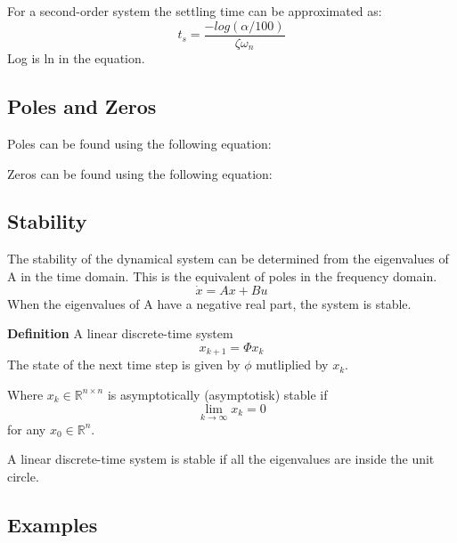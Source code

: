 For a second-order system the settling time can be approximated as:
$$t_s = \frac{-log(\alpha/100)}{\zeta \omega_n}$$
Log is ln in the equation.

\subsection{Poles and Zeros}

Poles can be found using the following equation:

Zeros can be found using the following equation:



\subsection{Stability}
The stability of the dynamical system can be determined from the eigenvalues of A in the time domain.
This is the equivalent of poles in the frequency domain.
$$\dot{x} = Ax+Bu$$
When the eigenvalues of A have a negative real part, the system is stable.

\textbf{Definition}
A linear discrete-time system
$$x_{k+1}=\Phi x_k$$
The state of the next time step is given by $\phi$ mutliplied by $x_k$.

Where $x_k \in \mathbb{R}^{n \times n}$ is asymptotically (asymptotisk) stable if
$$\lim_{k \to \infty} x_k = 0$$
for any $x_0 \in \mathbb{R}^n$.

A linear discrete-time system is stable if all the eigenvalues are inside the unit circle.




\subsection{Examples}
